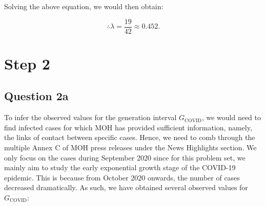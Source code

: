 \documentclass[11pt,fancychapters]{article}
\begin{document}
Solving the above equation, we would then obtain:

\begin{tcolorbox}
\begin{equation}\label{eqn1e3}
    \therefore \lambda = \frac{19}{42} \approx 0.452.
\end{equation}
\end{tcolorbox}

\section*{Step 2}

\subsection*{Question 2a}

To infer the observed values for the generation interval $G_\text{COVID}$, we would need to find infected cases for which MOH has provided sufficient information, namely, the links of contact between specific cases. Hence, we need to comb through the multiple Annex C of MOH press releases under the News Highlights section. We only focus on the cases during September 2020 since for this problem set, we mainly aim to study the early exponential growth stage of the COVID-19 epidemic. This is because from October 2020 onwards, the number of cases decreased dramatically. As such, we have obtained several observed values for $G_\text{COVID}$:
\end{document}
